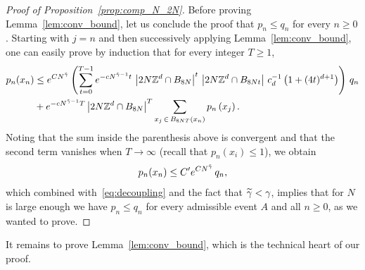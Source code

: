 \documentclass[10pt]{amsart}
\theoremstyle{definition}\newtheorem{defi}[theo]{Definition}\newtheorem{rema}[theo]{Remark}\newtheorem{exam}[theo]{Example}\newtheorem{exem}[theo]{Example}\newtheorem{nota}[theo]{Notation}
\newcommand{\Z}{\mathbb{Z}}
\let\oldtilde\tilde
\renewcommand*{\tilde}[1]{\mathchoice{\widetilde{#1}}{\widetilde{#1}}{\oldtilde{#1}}{\oldtilde{#1}}}
\begin{document}
\begin{proof}[Proof of Proposition~\ref{prop:comp_N_2N}]
Before proving Lemma~\ref{lem:conv_bound}, let us conclude the proof that $p_n\leq q_n$ for every $n\geq0$. Starting with $j=n$ and then successively applying Lemma~\ref{lem:conv_bound}, one can easily prove by induction that for every integer $T\geq1$,
\begin{align*}
\begin{split}
p_n(x_n) & \leq e^{CN^{\tilde{\gamma}}} \left(\sum_{t=0}^{T-1} e^{-cN^{\tilde{\gamma}-1}t}\, \left|2N\Z^d\cap B_{8N}\right|^t\, \left|2N\Z^d\cap B_{8Nt}\right|\, c_d^{-1}\left(1+(4t)^{d+1}\right)\right)\,q_n \\
& +e^{-cN^{\tilde{\gamma}-1}T} \left|2N\Z^d\cap B_{8N}\right|^T \sum_{x_j\,\in\,B_{8NT}\left(x_n\right)} p_n\left(x_j\right).
\end{split}
\end{align*}
Noting that the sum inside the parenthesis above is convergent and that the second term vanishes when $T\to\infty$ (recall that $p_n(x_i)\leq1$), we obtain
\begin{equation*}
p_n(x_n)\leq C'e^{CN^{\tilde{\gamma}}}\,q_n,
\end{equation*}
which combined with~\eqref{eq:decoupling} and the fact that $\tilde{\gamma}<\gamma$, implies that for $N$ is large enough we have $p_n\leq q_n$ for every admissible event $A$ and all $n\geq0$, as we wanted to prove.
\end{proof}

It remains to prove Lemma~\ref{lem:conv_bound}, which is the technical heart of our proof.
\end{document}
